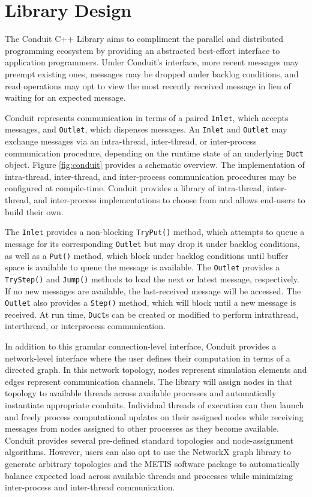 \section{Library Design}



The Conduit C++ Library aims to compliment the parallel and distributed programming ecosystem by providing an abstracted best-effort interface to application programmers.
Under Conduit's interface, more recent messages may preempt existing ones, messages may be dropped under backlog conditions, and read operations may opt to view the most recently received message in lieu of waiting for an expected message.

Conduit represents communication in terms of a paired \texttt{Inlet}, which accepts messages, and \texttt{Outlet}, which dispenses messages.
An \texttt{Inlet} and \texttt{Outlet} may exchange messages via an intra-thread, inter-thread, or inter-process communication procedure, depending on the runtime state of an underlying \texttt{Duct} object.
Figure \ref{fig:conduit} provides a schematic overview.
The implementation of intra-thread, inter-thread, and inter-process communication procedures may be configured at compile-time.
Conduit provides a library of intra-thread, inter-thread, and inter-process implementations to choose from and allows end-users to build their own.

The \texttt{Inlet} provides a non-blocking \texttt{TryPut()} method, which attempts to queue a message for its corresponding \texttt{Outlet} but may drop it under backlog conditions, as well as a \texttt{Put()} method, which block under backlog conditions until buffer space is available to queue the message is available.
The \texttt{Outlet} provides a \texttt{TryStep()} and \texttt{Jump()} methods to load the next or latest message, respectively.
If no new messages are available, the last-received message will be accessed.
The \texttt{Outlet} also provides a \texttt{Step()} method, which will block until a new message is received.
At run time, \texttt{Duct}s can be created or modified to perform intrathread, interthread, or interprocess communication. 

In addition to this granular connection-level interface, Conduit provides a network-level interface where the user defines their computation in terms of a directed graph.
In this network topology, nodes represent simulation elements and edges represent communication channels.
The library will assign nodes in that topology to available threads across available processes and automatically instantiate appropriate conduits.
Individual threads of execution can then launch and freely process computational updates on their assigned nodes while receiving messages from nodes assigned to other processes as they become available.
Conduit provides several pre-defined standard topologies and node-assignment algorithms.
However, users can also opt to use the NetworkX graph library \cite{hagberg2008exploring} to generate arbitrary topologies and the METIS software package \cite{gupta1997fast} to automatically balance expected load across available threads and processes while minimizing inter-process and inter-thread communication.

